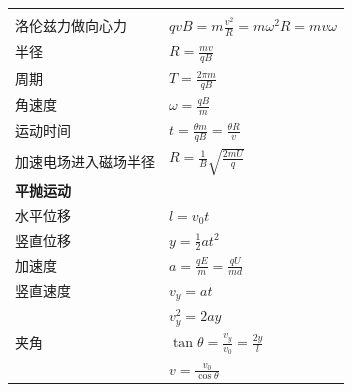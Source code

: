 \documentclass{../cheatsheet}
\begin{document}

\begin{tabularx}{\columnwidth}{XX}
	\rowcolor{blue!30}
	\multicolumn{2}{l}{\parbox[c][2.5\ht\strutbox][c]{0.9\columnwidth}{\Large 带电粒子的运动}} \\
    洛伦兹力做向心力&$qvB=m\frac{v^2}{R}=m\omega^2R=mv\omega$\\
    半径&$R=\frac{mv}{qB}$\\
    周期&$T=\frac{2\pi m}{qB}$\\
    角速度&$\omega=\frac{qB}{m}$\\
    运动时间&$t=\frac{\theta m}{qB}=\frac{\theta R}{v}$\\
    加速电场进入磁场半径&$R=\frac1B\sqrt{\frac{2mU}{q}}$\\
    \multicolumn{2}{l}{\textbf{平抛运动}}\\
    水平位移&$l=v_0t$\\
    竖直位移&$y=\frac{1}{2}at^2$\\
    加速度&$a=\frac{qE}{m}=\frac{qU}{md}$\\
    竖直速度&$v_y=at$\\
    &$v_y^2=2ay$\\
    夹角&$\tan\theta=\frac{v_y}{v_0}=\frac{2y}{l}$\\
    &$v=\frac{v_0}{\cos\theta}$\\

\end{tabularx}
\end{document}
